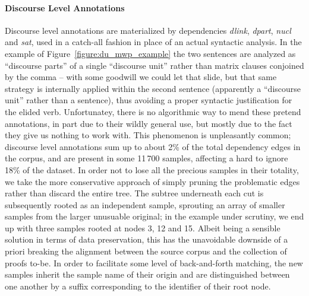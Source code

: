 \paragraph{Discourse Level Annotations}
Discourse level annotations are materialized by dependencies \textit{dlink}, \textit{dpart}, \textit{nucl} and \textit{sat}, used in a catch-all fashion in place of an actual syntactic analysis.
In the example of Figure~\ref{figure:du_mwp_example} the two sentences are analyzed as ``discourse parts'' of a single ``discourse unit'' rather than matrix clauses conjoined by the comma -- with some goodwill we could let that slide, but that same strategy is internally applied within the second sentence (apparently a ``discourse unit'' rather than a sentence), thus avoiding a proper syntactic justification for the elided verb. 
Unfortunatey, there is no algorithmic way to mend these pretend annotations, in part due to their wildly general use, but mostly due to the fact they give us nothing to work with.
This phenomenon is unpleasantly common; discourse level annotations sum up to about 2\% of the total dependency edges in the corpus, and are present in some 11\,700 samples, affecting a hard to ignore 18\% of the dataset.
In order not to lose all the precious samples in their totality, we take the more conservative approach of simply pruning the problematic edges rather than discard the entire tree.
The subtree underneath each cut is subsequently rooted as an independent sample, sprouting an array of smaller samples from the larger unusuable original; in the example under scrutiny, we end up with three samples rooted at nodes 3, 12 and 15.
Albeit being a sensible solution in terms of data preservation, this has the unavoidable downside of a priori breaking the alignment between the source corpus and the collection of proofs to-be.
In order to facilitate some level of back-and-forth matching, the new samples inherit the sample name of their origin and are distinguished between one another by a suffix corresponding to the identifier of their root node.

